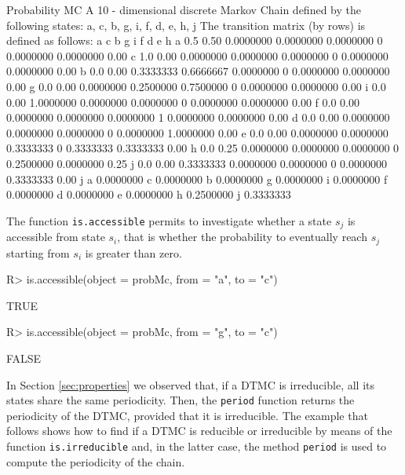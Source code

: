 \documentclass[article,nojss]{jss}
\begin{document}
\begin{CodeChunk}
\begin{CodeOutput}
Probability MC 
 A  10 - dimensional discrete Markov Chain defined by the following states: 
 a, c, b, g, i, f, d, e, h, j 
 The transition matrix  (by rows)  is defined as follows: 
    a    c         b         g         i f         d         e    h
a 0.5 0.50 0.0000000 0.0000000 0.0000000 0 0.0000000 0.0000000 0.00
c 1.0 0.00 0.0000000 0.0000000 0.0000000 0 0.0000000 0.0000000 0.00
b 0.0 0.00 0.3333333 0.6666667 0.0000000 0 0.0000000 0.0000000 0.00
g 0.0 0.00 0.0000000 0.2500000 0.7500000 0 0.0000000 0.0000000 0.00
i 0.0 0.00 1.0000000 0.0000000 0.0000000 0 0.0000000 0.0000000 0.00
f 0.0 0.00 0.0000000 0.0000000 0.0000000 1 0.0000000 0.0000000 0.00
d 0.0 0.00 0.0000000 0.0000000 0.0000000 0 0.0000000 1.0000000 0.00
e 0.0 0.00 0.0000000 0.0000000 0.3333333 0 0.3333333 0.3333333 0.00
h 0.0 0.25 0.0000000 0.0000000 0.0000000 0 0.2500000 0.0000000 0.25
j 0.0 0.00 0.3333333 0.0000000 0.0000000 0 0.0000000 0.3333333 0.00
          j
a 0.0000000
c 0.0000000
b 0.0000000
g 0.0000000
i 0.0000000
f 0.0000000
d 0.0000000
e 0.0000000
h 0.2500000
j 0.3333333
\end{CodeOutput}
\end{CodeChunk}

The function \texttt{is.accessible} permits to investigate whether a state \(s_{j}\) is accessible from state \(s_i\), that is whether the probability to eventually reach \(s_j\) starting from \(s_{i}\) is greater than zero.

\begin{CodeChunk}

\begin{CodeInput}
R> is.accessible(object = probMc, from = "a", to = "c")
\end{CodeInput}

\begin{CodeOutput}
[1] TRUE
\end{CodeOutput}

\begin{CodeInput}
R> is.accessible(object = probMc, from = "g", to = "c")
\end{CodeInput}

\begin{CodeOutput}
[1] FALSE
\end{CodeOutput}
\end{CodeChunk}

In Section \ref{sec:properties} we observed that, if a DTMC is irreducible, all its states share the same periodicity. Then, the \texttt{period} function returns the periodicity of the DTMC, provided that it is irreducible. The example that follows shows how to find if a DTMC is reducible or irreducible by means of the function \texttt{is.irreducible} and, in the latter case, the method \texttt{period} is used to compute the periodicity of the chain.
\end{document}
